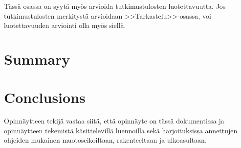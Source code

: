 \documentclass[english,12pt,a4paper,pdftex,sci,utf8]{aaltothesis}
\begin{document}
T\"ass\"a osassa on syyt\"a my\"os arvioida tutkimustulosten luotettavuutta.
Jos tutkimustulosten merkityst\"a arvioidaan >>Tarkastelu>>-osassa,
voi luotettavuuden arviointi olla my\"os siell\"a. 

\clearpage

\section{Summary}  \label{sec:summary}

\section{Conclusions}  \label{sec:conclusions}


Opinn\"aytteen tekij\"a vastaa siit\"a, ett\"a opinn\"ayte on t\"ass\"a dokumentissa
ja opinn\"aytteen tekemist\"a k\"asittelevill\"a luennoilla sek\"a
harjoituksissa annettujen ohjeiden mukainen muotoseikoiltaan,
rakenteeltaan ja ulkoasultaan.\cite{grochowski2004best}


\cleardoublepage
{}



\end{document}
